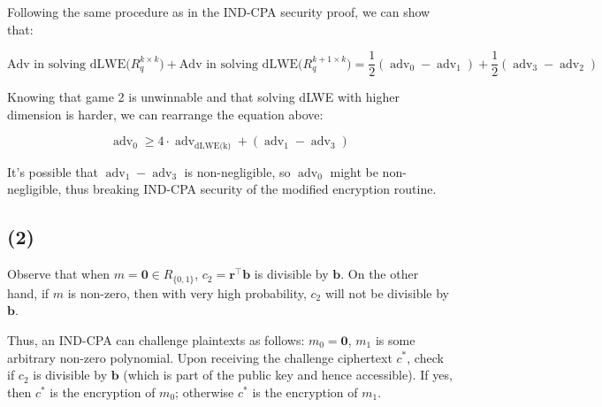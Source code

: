\documentclass{article}
\begin{document}
Following the same procedure as in the IND-CPA security proof, we can show that:

$$
\text{Adv in solving dLWE($R_q^{k \times k}$)} + 
\text{Adv in solving dLWE($R_q^{k+1 \times k}$)}
= \frac{1}{2}(\operatorname{adv}_0 - \operatorname{adv}_1) 
+ \frac{1}{2}(\operatorname{adv}_3 - \operatorname{adv}_2)
$$

Knowing that game 2 is unwinnable and that solving dLWE with higher dimension is harder, we can rearrange the equation above:

$$
\operatorname{adv}_0 
\geq 4 \cdot \operatorname{adv}_\text{dLWE(k)} + (\operatorname{adv}_1 - \operatorname{adv}_3)
$$

It's possible that $\operatorname{adv}_1 - \operatorname{adv}_3$ is non-negligible, so $\operatorname{adv}_0$ might be non-negligible, thus breaking IND-CPA security of the modified encryption routine.

\subsection*{(2)}
Observe that when $m = \mathbf{0} \in R_{\{0,1\}}$, $c_2 = \mathbf{r}^\intercal \mathbf{b}$ is divisible by $\mathbf{b}$. On the other hand, if $m$ is non-zero, then with very high probability, $c_2$ will not be divisible by $\mathbf{b}$.

Thus, an IND-CPA can challenge plaintexts as follows: $m_0 = \mathbf{0}$, $m_1$ is some arbitrary non-zero polynomial. Upon receiving the challenge ciphertext $c^\ast$, check if $c_2$ is divisible by $\mathbf{b}$ (which is part of the public key and hence accessible). If yes, then $c^\ast$ is the encryption of $m_0$; otherwise $c^\ast$ is the encryption of $m_1$.
\end{document}
